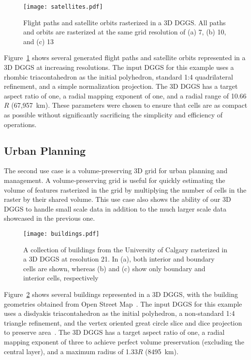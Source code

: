 \begin{figure}[ht!]
	\centering
	\texttt{[image: satellites.pdf]}
	\caption[Flight path and satellite orbit use case showing several sample trajectories]{
		Flight paths and satellite orbits rasterized in a 3D DGGS.
		All paths and orbits are rasterized at the same grid resolution of (a) 7, (b) 10, and (c) 13
	}
	\label{fig:satellites}
\end{figure}


Figure~\ref{fig:satellites} shows several generated flight paths and satellite orbits represented in a 3D DGGS at increasing resolutions.
The input DGGS for this example uses a rhombic triacontahedron as the initial polyhedron, standard 1:4 quadrilateral refinement, and a simple normalization projection.
The 3D DGGS has a target aspect ratio of one, a radial mapping exponent of one, and a radial range of 10.66$R$ (67,957~km).
These parameters were chosen to ensure that cells are as compact as possible without significantly sacrificing the simplicity and efficiency of operations.

\subsection{Urban Planning}
The second use case is a volume-preserving 3D grid for urban planning and management.
A volume-preserving grid is useful for quickly estimating the volume of features rasterized in the grid by multiplying the number of cells in the raster by their shared volume.
This use case also shows the ability of our 3D DGGS to handle small scale data in addition to the much larger scale data showcased in the previous one.


\begin{figure}[ht!]
	\centering
	\texttt{[image: buildings.pdf]}
	\caption[Urban planning use case showing various rasterized buildings]{
		A collection of buildings from the University of Calgary rasterized in a 3D DGGS at resolution 21.
		In (a), both interior and boundary cells are shown, whereas (b) and (c) show only boundary and interior cells, respectively
	}
	\label{fig:urbanplanning}
\end{figure}


Figure~\ref{fig:urbanplanning} shows several buildings represented in a 3D DGGS, with the building geometries obtained from Open Street Map~\cite{osm}.
The input DGGS for this example uses a disdyakis triacontahedron as the initial polyhedron, a non-standard 1:4 triangle refinement, and the vertex oriented great circle slice and dice projection~\cite{van2006slice} to preserve area~\cite{hallDT}.
The 3D DGGS has a target aspect ratio of one, a radial mapping exponent of three to achieve perfect volume preservation (excluding the central layer), and a maximum radius of 1.33$R$ (8495~km).


